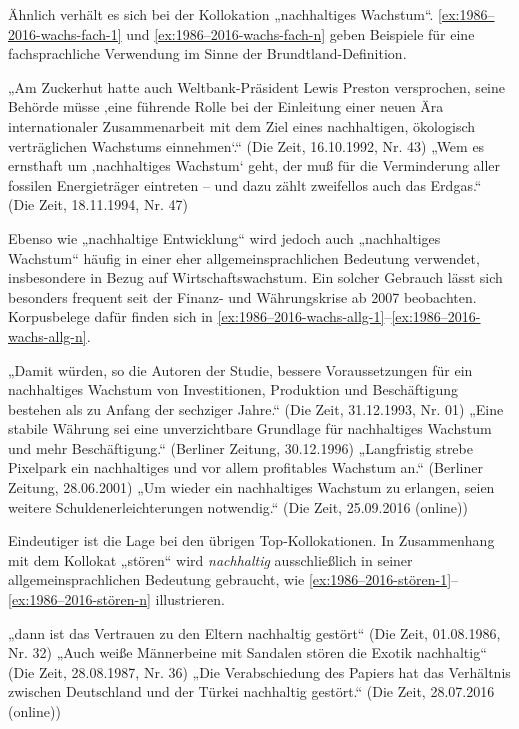 \documentclass[
    german,
    a4paper,%
    12pt,%
    oneside,%
    toc=bibliography,
    final,
]{scrartcl}
\begin{document}
Ähnlich verhält es sich bei der Kollokation „nachhaltiges Wachstum“. \ref{ex:1986–2016-wachs-fach-1} und \ref{ex:1986–2016-wachs-fach-n} geben Beispiele für eine fachsprachliche Verwendung im Sinne der Brundtland-Definition.

\begin{exe}
\ex\label{ex:1986–2016-wachs-fach-1} „Am Zuckerhut hatte auch Weltbank-Präsident Lewis Preston versprochen, seine Behörde müsse ‚eine führende Rolle bei der Einleitung einer neuen Ära internationaler Zusammenarbeit mit dem Ziel eines nachhaltigen, ökologisch verträglichen Wachstums einnehmen‘.“ (Die Zeit, 16.10.1992, Nr. 43)
\ex\label{ex:1986–2016-wachs-fach-n} „Wem es ernsthaft um ‚nachhaltiges Wachstum‘ geht, der muß für die Verminderung aller fossilen Energieträger eintreten – und dazu zählt zweifellos auch das Erdgas.“ (Die Zeit, 18.11.1994, Nr. 47)
\end{exe}

Ebenso wie „nachhaltige Entwicklung“ wird jedoch auch „nachhaltiges Wachstum“ häufig in einer eher allgemeinsprachlichen Bedeutung verwendet, insbesondere in Bezug auf Wirtschaftswachstum. Ein solcher Gebrauch lässt sich besonders frequent seit der Finanz- und Währungskrise ab 2007 beobachten. Korpusbelege dafür finden sich in \ref{ex:1986–2016-wachs-allg-1}–\ref{ex:1986–2016-wachs-allg-n}.

\begin{exe}
\ex\label{ex:1986–2016-wachs-allg-1} „Damit würden, so die Autoren der Studie, bessere Voraussetzungen für ein nachhaltiges Wachstum von Investitionen, Produktion und Beschäftigung bestehen als zu Anfang der sechziger Jahre.“ (Die Zeit, 31.12.1993, Nr. 01)
\ex „Eine stabile Währung sei eine unverzichtbare Grundlage für nachhaltiges Wachstum und mehr Beschäftigung.“ (Berliner Zeitung, 30.12.1996)
\ex „Langfristig strebe Pixelpark ein nachhaltiges und vor allem profitables Wachstum an.“ (Berliner Zeitung, 28.06.2001)
\ex\label{ex:1986–2016-wachs-allg-n} „Um wieder ein nachhaltiges Wachstum zu erlangen, seien weitere Schuldenerleichterungen notwendig.“ (Die Zeit, 25.09.2016 (online))
\end{exe}

Eindeutiger ist die Lage bei den übrigen Top-Kollokationen. In Zusammenhang mit dem Kollokat „stören“ wird \textit{nachhaltig} ausschließlich in seiner allgemeinsprachlichen Bedeutung gebraucht, wie \ref{ex:1986–2016-stören-1}–\ref{ex:1986–2016-stören-n} illustrieren.

\begin{exe}
\ex\label{ex:1986–2016-stören-1} „dann ist das Vertrauen zu den Eltern nachhaltig gestört“ (Die Zeit, 01.08.1986, Nr. 32)
\ex „Auch weiße Männerbeine mit Sandalen stören die Exotik nachhaltig“ (Die Zeit, 28.08.1987, Nr. 36)
\ex\label{ex:1986–2016-stören-n} „Die Verabschiedung des Papiers hat das Verhältnis zwischen Deutschland und der Türkei nachhaltig gestört.“ (Die Zeit, 28.07.2016 (online))
\end{exe}
\end{document}
